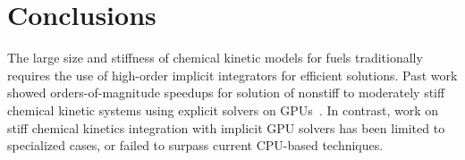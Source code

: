 \documentclass[preprint,review,11pt]{elsarticle}
\begin{document}
\section{Conclusions}
\label{S:conclusions}

The large size and stiffness of chemical kinetic models for fuels traditionally requires the use of high-order implicit integrators for efficient solutions.
Past work showed orders-of-magnitude speedups for solution of nonstiff to moderately stiff chemical kinetic systems using explicit solvers on GPUs~\cite{Niemeyer:2011aa,Le2013596,Niemeyer:2014aa}.
In contrast, work on stiff chemical kinetics integration with implicit GPU solvers has been limited to specialized cases, or failed to surpass current CPU-based techniques.
\end{document}
